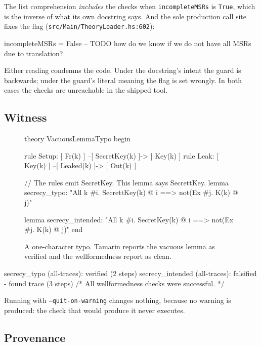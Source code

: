\documentclass[version=preprint]{iacrcc}
\newcommand{\code}[1]{\texttt{\small #1}}
\theoremstyle{definition}
\theoremstyle{remark}
\begin{document}
	The list comprehension \emph{includes} the checks when \code{incompleteMSRs} is
	\code{True}, which is the inverse of what its own docstring says. And the sole
	production call site fixes the flag (\code{src/Main/TheoryLoader.hs:602}):

	\begin{hslisting}
		incompleteMSRs = False
		-- TODO how do we know if we do not have all MSRs due to translation?
	\end{hslisting}

	Either reading condemns the code. Under the docstring's intent the guard is
	backwards; under the guard's literal meaning the flag is set wrongly. In both
	cases the checks are unreachable in the shipped tool.

	\subsection{Witness}

	\begin{figure}[t]
		\begin{tmlisting}
			theory VacuousLemmaTypo begin

			rule Setup: [ Fr(k)  ] --[ SecretKey(k) ]-> [ Key(k) ]
			rule Leak:  [ Key(k) ] --[ Leaked(k)    ]-> [ Out(k) ]

			// The rules emit SecretKey. This lemma says SecrettKey.
			lemma secrecy_typo:
			"All k #i. SecrettKey(k) @ i ==> not(Ex #j. K(k) @ j)"

			lemma secrecy_intended:
			"All k #i. SecretKey(k) @ i ==> not(Ex #j. K(k) @ j)"
			end
		\end{tmlisting}
		\caption{A one-character typo. Tamarin reports the vacuous lemma as verified
			and the wellformedness report as clean.}\label{fig:poc03}
	\end{figure}

	\begin{outlisting}
		secrecy_typo     (all-traces): verified (2 steps)
		secrecy_intended (all-traces): falsified - found trace (3 steps)
		/* All wellformedness checks were successful. */
	\end{outlisting}

	Running with \code{--quit-on-warning} changes nothing, because no warning is
	produced: the check that would produce it never executes.

	\subsection{Provenance}
\end{document}
